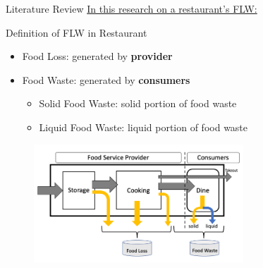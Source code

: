 \documentclass{beamer}
\begin{document}
\begin{frame}{Literature Review}
    \underline{In this research on a restaurant's FLW:}
    \begin{block}{Definition of FLW in Restaurant}
        \begin{itemize}
            \item Food Loss: generated by \textbf{provider}
            \item Food Waste: generated by \textbf{consumers}
            \begin{itemize}
                \item Solid Food Waste: solid portion of food waste
                \item Liquid Food Waste: liquid portion of food waste
            \end{itemize}
        \end{itemize}
    \end{block}
        \begin{figure}
            \centering
            \includegraphics[width=0.7\textwidth,height=0.7\textheight,keepaspectratio]{defnFLWrest.png}
        \end{figure}
\end{frame}

\end{document}
